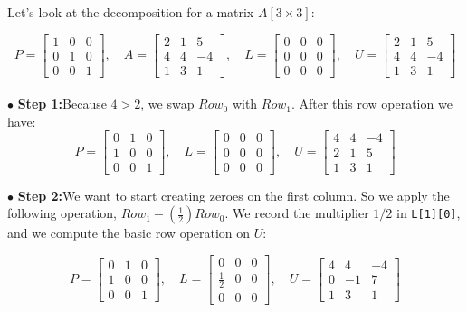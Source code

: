 Let’s look at the decomposition for a matrix $A[3\times 3]$:

$$
P=
\begin{bmatrix}
1 & 0 & 0 \\
0 & 1 & 0 \\
0 & 0 & 1  
\end{bmatrix}
,\quad A =
\begin{bmatrix}
2 & 1 & 5 \\
4 & 4 & -4 \\
1 & 3 & 1  
\end{bmatrix}
,\quad L =
\begin{bmatrix}
0 & 0 & 0 \\
0 & 0 & 0 \\
0 & 0 & 0  
\end{bmatrix}
,\quad U = 
\begin{bmatrix}
2 & 1 & 5 \\
4 & 4 & -4 \\
1 & 3 & 1  
\end{bmatrix}
$$
\\

$\bullet$ {\bf Step 1:}\quad Because $4>2$, we swap $Row_0$ with 
$Row_1$. After this row operation we have:
$$
P=
\begin{bmatrix}
0 & 1 & 0 \\
1 & 0 & 0 \\
0 & 0 & 1  
\end{bmatrix}
, \quad 
L =
\begin{bmatrix}
0 & 0 & 0 \\
0 & 0 & 0 \\
0 & 0 & 0  
\end{bmatrix}
, \quad
U =
\begin{bmatrix}
4 & 4 & -4 \\
2 & 1 & 5 \\
1 & 3 & 1  
\end{bmatrix}
$$

$\bullet$ {\bf Step 2:}\quad We want to start creating zeroes on the first column. So we apply the following operation, $Row_1 - (\frac{1}{2})Row_0$. We record the multiplier $1/2$ in {\tt L[1][0]}, and we compute the basic row operation on $U$:

$$
P=
\begin{bmatrix}
0 & 1 & 0 \\
1 & 0 & 0 \\
0 & 0 & 1  
\end{bmatrix}
, \quad
L =
\begin{bmatrix}
0 & 0 & 0 \\
\frac{1}{2} & 0 & 0 \\
0 & 0 & 0  
\end{bmatrix}
, \quad
U =
\begin{bmatrix}
4 & 4 & -4 \\
0 & -1 & 7 \\
1 & 3 & 1  
\end{bmatrix}
$$

